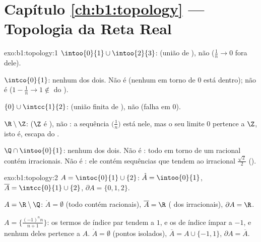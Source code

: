 \section*{Capítulo \ref{ch:b1:topology} --- Topologia da Reta Real}

\begin{solution}{exo:b1:topology:1}
$\intoo{0}{1} \cup \intoo{2}{3}$:  (união de ), não
 ($\frac 1n \to 0$ fora dele).

$\intco{0}{1}$: nenhum dos dois. Não é  (nenhum  em torno de $0$
está dentro); não é  ($1 - \frac1n \to 1 \notin$ do ).

$\{0\} \cup \intcc{1}{2}$:  (união finita de ), não
 (falha em $0$).

$\R \setminus \Z$:  ($\Z$ é ), não : a sequência
$\bigl(\frac 1n\bigr)$ está nele, mas o seu limite $0$ pertence a $\Z$,
isto é, escapa do .

$\Q \cap \intoo{0}{1}$: nenhum dos dois. Não é : todo  em torno de um
racional contém irracionais. Não é : ele contém sequências
que tendem ao irracional $\frac{\sqrt 2}{2}$ ().
\end{solution}

\begin{solution}{exo:b1:topology:2}
$A = \intoc{0}{1} \cup \{2\}$: $\mathring A = \intoo{0}{1}$,
$\overline A = \intcc{0}{1} \cup \{2\}$, $\partial A = \{0, 1, 2\}$.

$A = \R \setminus \Q$: $\mathring A = \emptyset$ (todo 
contém racionais), $\overline A = \R$ ( dos
irracionais), $\partial A = \R$.

$A = \bigl\{\frac{(-1)^n n}{n+1}\bigr\}$: os termos de índice par tendem a $1$,
e os de índice ímpar a $-1$, e nenhum deles pertence a $A$. $\mathring A =
\emptyset$ (pontos isolados), $\overline A = A \cup \{-1, 1\}$,
$\partial A = \overline A$.
\end{solution}

